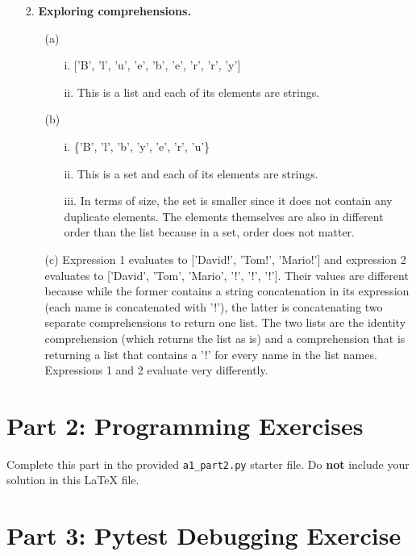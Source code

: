 \documentclass[12pt]{article}
\begin{document}
\begin{enumerate}
\item[2.] \textbf{Exploring comprehensions.}

\begin{enumerate}
\item[(a)]
\begin{enumerate}
    \item[i.] ['B', 'l', 'u', 'e', 'b', 'e', 'r', 'r', 'y']
    \item[ii.] This is a list and each of its elements are strings. 
\end{enumerate}
\item[(b)]
\begin{enumerate}
    \item[i.] \{'B', 'l', 'b', 'y', 'e', 'r', 'u'\}
    \item[ii.] This is a set and each of its elements are strings. 
    \item[iii.] In terms of size, the set is smaller since it does not contain any duplicate elements. The elements themselves are also in different order than the list because in a set, order does not matter.  
\end{enumerate}
\item[(c)]
Expression 1 evaluates to ['David!', 'Tom!', 'Mario!'] and expression 2 evaluates to ['David', 'Tom', 'Mario', '!', '!', '!']. Their values are different because while the former contains a string concatenation in its expression (each name is concatenated with '!'), the latter is concatenating two separate comprehensions to return one list. The two lists are the identity comprehension (which returns the list as is) and a comprehension that is returning a list that contains a '!' for every name in the list names. Expressions 1 and 2 evaluate very differently.  
\end{enumerate}
\end{enumerate}

\section*{Part 2: Programming Exercises}

Complete this part in the provided \texttt{a1\_part2.py} starter file.
Do \textbf{not} include your solution in this LaTeX file.

\section*{Part 3: Pytest Debugging Exercise}
\end{document}
